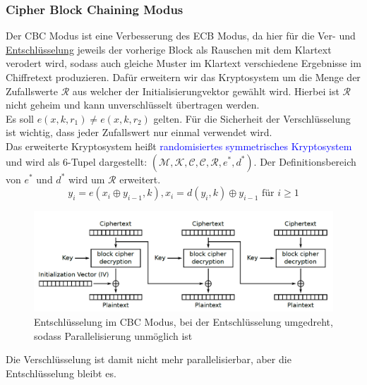 \documentclass[a4paper,12pt,leqno]{article}
\newcommand{\blue}[1]{\textcolor{blue}{#1}}
\begin{document}
\subsubsection{Cipher Block Chaining Modus}
Der CBC Modus ist eine Verbesserung des ECB Modus, da hier für die Ver- und \hyperref[fig:CBCModus]{Entschlüsselung} jeweils der vorherige Block als Rauschen mit dem Klartext verodert wird, sodass auch gleiche Muster im Klartext verschiedene Ergebnisse im Chiffretext produzieren. Dafür erweitern wir das Kryptosystem um die Menge der Zufallswerte $\mathcal{R}$ aus welcher der Initialisierungvektor gewählt wird. Hierbei ist $\mathcal{R}$ nicht geheim und kann unverschlüsselt übertragen werden.\\
Es soll $e(x,k,r_1)\neq e(x,k,r_2)$ gelten. Für die Sicherheit der Verschlüsselung ist wichtig, dass jeder Zufallswert nur einmal verwendet wird.\\
Das erweiterte Kryptosystem heißt \blue{randomisiertes symmetrisches Kryptosystem} und wird als 6-Tupel dargestellt: $(\mathcal{M},\mathcal{K},\mathcal{C},\mathcal{C},\mathcal{R},e^*,d^*)$. Der Definitionsbereich von $e^*$ und $d^*$ wird um $\mathcal{R}$ erweitert.
$$y_i = e(x_i\oplus y_{i-1},k), x_i = d(y_i,k)\oplus y_{i-1} \textrm{ für } i\geq 1$$
\begin{figure}
\centering
\includegraphics[scale=0.5]{Grafiken/CBCModus.png}
\caption{Entschlüsselung im CBC Modus, bei der Entschlüsselung umgedreht, sodass Parallelisierung unmöglich ist}
\label{fig:CBCModus}
\end{figure}
Die Verschlüsselung ist damit nicht mehr parallelisierbar, aber die Entschlüsselung bleibt es.\\
\end{document}
